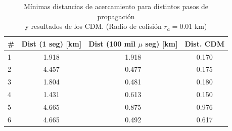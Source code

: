 \begin{table}[!h]
 \caption{ARxCODE a partir de los CDM \\ Propagaciones cada 100.000 microsegundos - (Radio de colisi\'on $r_{a}=0.01$ km)}
\centering
 \label{tab:cdmsproc100mseg}
 \end{table}

 \begin{table}[!h]
 \caption{M\'inimas distancias de acercamiento para distintos pasos de propagaci\'on \\ y resultados de los CDM. (Radio de colisi\'on $r_{a}=0.01$ km)}
\label{tab:cdmsMinD}
\begin{tabular}{lccc}
 \hline \hline
  \rowcolor{lightgray}
 \# & Dist (1 seg) [km] & Dist (100 mil $\mu$ seg) [km] & Dist. CDM\\
 \hline \hline
 1 & 1.918 &  1.918&  0.170 \\
 
 2 & 4.457 & 0.477 & 0.175  \\

 3 & 1.804 & 0.481 & 0.180\\
 
 4 & 1.431 & 0.613 & 0.150\\
 
 5 & 4.665 & 0.875 & 0.976 \\
 
 6 & 4.665 & 0.492 & 0.617\\
 \hline
\end{tabular} 
\end{table}

